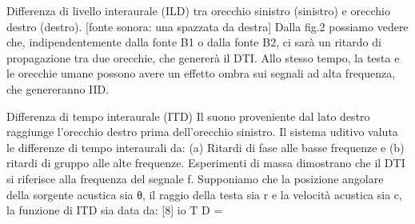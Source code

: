Differenza di livello interaurale (ILD) tra orecchio sinistro (sinistro) e orecchio destro (destro).
[fonte sonora: una spazzata da destra]
Dalla fig.2 possiamo vedere che, indipendentemente dalla fonte B1 o dalla fonte B2, ci sarà un ritardo di propagazione tra due orecchie, che genererà il DTI. Allo stesso tempo, la testa e le orecchie umane possono avere un effetto ombra sui segnali ad alta frequenza, che genereranno IID.

Differenza di tempo interaurale (ITD) Il suono proveniente dal lato destro raggiunge l'orecchio destro prima dell'orecchio sinistro. Il sistema uditivo valuta le differenze di tempo interaurali da: (a) Ritardi di fase alle basse frequenze e (b) ritardi di gruppo alle alte frequenze.
Esperimenti di massa dimostrano che il DTI si riferisce alla frequenza del segnale f. Supponiamo che la posizione angolare della sorgente acustica sia θ, il raggio della testa sia r e la velocità acustica sia c, la funzione di ITD sia data da: [8]
io
T
D
=
